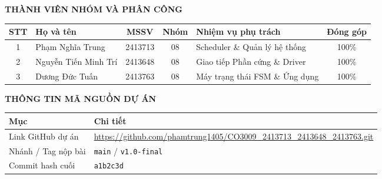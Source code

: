 \textbf{\Large THÀNH VIÊN NHÓM VÀ PHÂN CÔNG}
\bigskip

\begin{center}
    \small
    \setlength{\tabcolsep}{4pt}
    \renewcommand{\arraystretch}{1.3}
    \begin{tabular}{|c|p{}|c|c|p{}|c|} \hline 
        \textbf{STT} & \textbf{Họ và tên} & \textbf{MSSV} & \textbf{Nhóm} & \textbf{Nhiệm vụ phụ trách} & \textbf{Đóng góp} \\ \hline 
        1 & Phạm Nghĩa Trung & 2413713 & 08 & Scheduler \& Quản lý hệ thống & 100\% \\ \hline 
        2 & Nguyễn Tiến Minh Trí & 2413648 & 08 & Giao tiếp Phần cứng \& Driver & 100\% \\ \hline 
        3 & Dương Đức Tuấn & 2413763 & 08 & Máy trạng thái FSM \& Ứng dụng & 100\% \\ \hline
    \end{tabular}
\end{center}

\vspace{1cm}

\textbf{\Large THÔNG TIN MÃ NGUỒN DỰ ÁN}
\bigskip

\begin{center}
    \small
    \setlength{\tabcolsep}{6pt}
    \renewcommand{\arraystretch}{1.3}
    \begin{tabular}{|p{}|p{}|} \hline 
        \textbf{Mục} & \textbf{Chi tiết} \\ \hline 
        Link GitHub dự án & \url{https://github.com/phamtrung1405/CO3009_2413713_2413648_2413763.git} \\ \hline 
        Nhánh / Tag nộp bài & \texttt{main} / \texttt{v1.0-final} \\ \hline 
        Commit hash cuối & \texttt{a1b2c3d} \\ \hline 
    \end{tabular}
\end{center}

\newpage